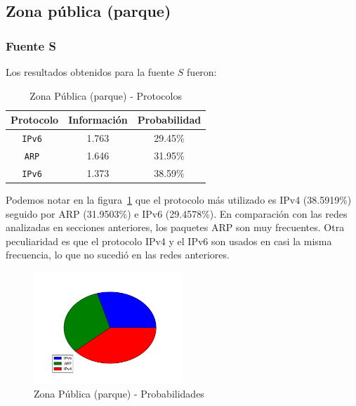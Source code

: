 \documentclass[final,inline,narroweqnarray,a4paper]{ieee}
\begin{document}
\subsection{Zona pública (parque)}
\subsubsection{Fuente S}

Los resultados obtenidos para la fuente $S$ fueron:

\begin{table}[H]
    \begin{center}
        \begin{tabular}{|c|c|c|}
            \hline
            \textbf{Protocolo} & \textbf{Información} & \textbf{Probabilidad} \\ \hline
            \texttt{IPv6      }& 1.763        & 29.45\%    \\ \hline
            \texttt{ARP       }& 1.646        & 31.95\%     \\ \hline
            \texttt{IPv6      }& 1.373        & 38.59\%    \\ \hline
        \end{tabular}
        \caption{Zona Pública (parque) - Protocolos}
        \label{table:parqueS}
    \end{center}
\end{table} 

Podemos notar en la figura~\ref{torta:parqueS} que el protocolo más utilizado es IPv4 (38.5919\%) seguido por ARP (31.9503\%) e IPv6 (29.4578\%). En comparación con las redes analizadas en secciones anteriores, los paquetes ARP son muy frecuentes. Otra peculiaridad es que el protocolo IPv4 y el IPv6 son usados en casi la misma frecuencia, lo que no sucedió en las redes anteriores.

\begin{figure}[H]
    \begin{center}
        \includegraphics[width=0.5\textwidth]{plot/parqueS-pie.png}
        \caption{Zona Pública (parque) - Probabilidades}
        \label{torta:parqueS}
    \end{center}
\end{figure}
\end{document}
